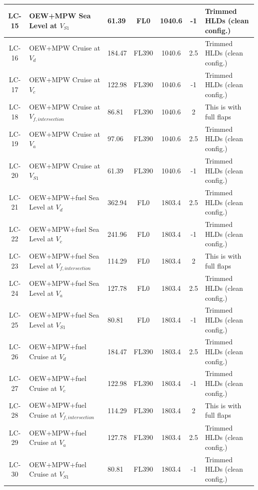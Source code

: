 \begin{longtable}{|>{\columncolor{blue!15}}c|p{3.2cm}|p{2cm}|c|c|c|p{2.6cm}|}
    LC-15 & OEW+MPW Sea Level at $V_{S1}$ & 61.39 & FL0 & 1040.6& -1 & Trimmed HLDs (clean config.) \\ 
    \hline
    LC-16 & OEW+MPW Cruise at $V_{d}$ & 184.47 & FL390 & 1040.6& 2.5 & Trimmed HLDs (clean config.) \\ 
    \hline
    LC-17 & OEW+MPW Cruise at $V_{c}$ & 122.98 & FL390 & 1040.6 & -1 & Trimmed HLDs (clean config.) \\ 
    \hline
    LC-18 & OEW+MPW Cruise at $V_{f,intersection}$ & 86.81 & FL390 & 1040.6 & 2 & This is with full flaps \\ 
    \hline
    LC-19 & OEW+MPW Cruise at $V_{a}$ & 97.06 & FL390 & 1040.6 & 2.5 & Trimmed HLDs (clean config.) \\ 
    \hline
    LC-20 & OEW+MPW Cruise at $V_{S1}$ & 61.39 & FL390 & 1040.6 & -1 & Trimmed HLDs (clean config.) \\ 
    \hline
    LC-21 & OEW+MPW+fuel Sea Level at $V_{d}$ & 362.94 & FL0 & 1803.4 & 2.5 & Trimmed HLDs (clean config.) \\ 
    \hline
    LC-22 & OEW+MPW+fuel Sea Level at $V_{c}$ & 241.96 & FL0 & 1803.4 & -1 & Trimmed HLDs (clean config.) \\ 
    \hline
    LC-23 & OEW+MPW+fuel Sea Level at $V_{f,intersection}$ & 114.29 & FL0 & 1803.4 & 2 & This is with full flaps \\ 
    \hline
    LC-24 & OEW+MPW+fuel Sea Level at $V_{a}$ & 127.78 & FL0 & 1803.4 & 2.5 & Trimmed HLDs (clean config.) \\ 
    \hline
    LC-25 & OEW+MPW+fuel Sea Level at $V_{S1}$ & 80.81 & FL0 & 1803.4 & -1 & Trimmed HLDs (clean config.) \\ 
    \hline
    LC-26 & OEW+MPW+fuel Cruise at $V_{d}$ & 184.47 & FL390 & 1803.4 & 2.5 & Trimmed HLDs (clean config.) \\ 
    \hline
    LC-27 & OEW+MPW+fuel Cruise at $V_{c}$ & 122.98 & FL390 & 1803.4 & -1 & Trimmed HLDs (clean config.) \\ 
    \hline
    LC-28 & OEW+MPW+fuel Cruise at $V_{f,intersection}$ & 114.29 & FL390 & 1803.4 & 2 & This is with full flaps \\ 
    \hline
    LC-29 & OEW+MPW+fuel Cruise at $V_{a}$ & 127.78 & FL390 & 1803.4 & 2.5 & Trimmed HLDs (clean config.) \\ 
    \hline
    LC-30 & OEW+MPW+fuel Cruise at $V_{S1}$ & 80.81 & FL390 & 1803.4 & -1 & Trimmed HLDs (clean config.) \\ 
    \hline
\end{longtable}


